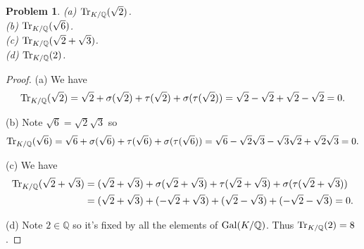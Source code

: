 \documentclass{article}
\newcommand{\gal}{\textup{Gal}}
\newcommand{\tr}{\textup{Tr}}
\newtheorem{problem}{Problem}
\begin{document}
\begin{problem}
(a) $\tr_{K/\mathbb{Q}} (\sqrt{2})$.\\
(b) $\tr_{K/\mathbb{Q}} (\sqrt{6})$.\\
(c) $\tr_{K/\mathbb{Q}} (\sqrt{2} + \sqrt{3})$.\\
(d) $\tr_{K/\mathbb{Q}} (2)$.
\end{problem}
\begin{proof}
(a) We have
\[
\tr_{K/\mathbb{Q}} (\sqrt{2}) = \sqrt{2} + \sigma(\sqrt{2}) + \tau(\sqrt{2}) + \sigma(\tau(\sqrt{2})) = \sqrt{2} - \sqrt{2} + \sqrt{2} - \sqrt{2} = 0.
\]

(b) Note $\sqrt{6} = \sqrt{2} \sqrt{3}$ so
\[
\tr_{K/\mathbb{Q}} (\sqrt{6}) = \sqrt{6} + \sigma(\sqrt{6}) + \tau(\sqrt{6}) + \sigma(\tau(\sqrt{6})) = \sqrt{6} - \sqrt{2} \sqrt{3} - \sqrt{3} \sqrt{2} + \sqrt{2} \sqrt{3} = 0.
\]

(c) We have
\begin{align*}
\tr_{K/\mathbb{Q}} (\sqrt{2} + \sqrt{3})
&= (\sqrt{2} + \sqrt{3}) + \sigma(\sqrt{2} + \sqrt{3}) + \tau(\sqrt{2} + \sqrt{3}) + \sigma(\tau(\sqrt{2} + \sqrt{3}))\\
&= (\sqrt{2} + \sqrt{3}) + (-\sqrt{2} + \sqrt{3}) + (\sqrt{2} - \sqrt{3}) + (-\sqrt{2} - \sqrt{3}) = 0.
\end{align*}

(d) Note $2 \in \mathbb{Q}$ so it's fixed by all the elements of $\gal(K/\mathbb{Q})$. Thus $\tr_{K/\mathbb{Q}} (2) = 8$.
\end{proof}
\end{document}
